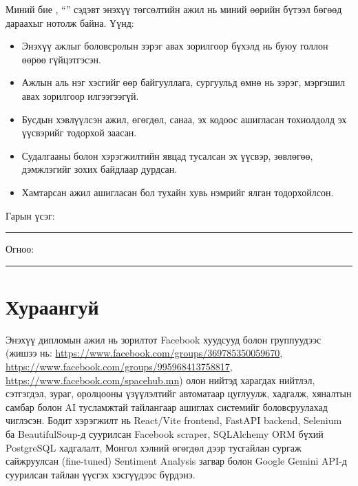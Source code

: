 \documentclass[
12pt,
oneside,
english,
onehalfspacing,
nolistspacing,
headsepline,
]{MUST-Thesis}
\newcommand{\authorshipname}{Зохиогч эрхийн хамгаалал}
\begin{document}
\begin{declaration}
\addchaptertocentry{\authorshipname}

\noindent Миний бие \shortname, ``\ttitle'' сэдэвт энэхүү төгсөлтийн ажил нь миний өөрийн бүтээл бөгөөд дараахыг нотолж байна. Үүнд:

\begin{itemize}
    \item Энэхүү ажлыг боловсролын зэрэг авах зорилгоор бүхэлд нь буюу голлон өөрөө гүйцэтгэсэн.
    \item Ажлын аль нэг хэсгийг өөр байгууллага, сургуульд өмнө нь зэрэг, мэргэшил авах зорилгоор илгээгээгүй.
    \item Бусдын хэвлүүлсэн ажил, өгөгдөл, санаа, эх кодоос ашигласан тохиолдолд эх үүсвэрийг тодорхой заасан.
    \item Судалгааны болон хэрэгжилтийн явцад тусалсан эх үүсвэр, зөвлөгөө, дэмжлэгийг зохих байдлаар дурдсан.
    \item Хамтарсан ажил ашигласан бол тухайн хувь нэмрийг ялган тодорхойлсон.
\end{itemize}
\bigskip

\noindent Гарын үсэг: \rule[-0.5em]{12.7em}{0.5pt}
\bigskip

\noindent Огноо: \rule[-0.5em]{15em}{0.5pt}
\end{declaration}

\clearpage

\chapter*{Хураангуй}

Энэхүү дипломын ажил нь зорилтот Facebook хуудсууд болон группуудээс (жишээ нь: \url{https://www.facebook.com/groups/369785350059670}, \url{https://www.facebook.com/groups/995968413758817}, \url{https://www.facebook.com/spacehub.mn}) олон нийтэд харагдах нийтлэл, сэтгэгдэл, зураг, оролцооны үзүүлэлтийг автоматаар цуглуулж, хадгалж, хяналтын самбар болон AI тусламжтай тайлангаар ашиглах системийг боловсруулахад чиглэсэн. Бодит хэрэгжилт нь React/Vite frontend, FastAPI backend, Selenium ба BeautifulSoup-д суурилсан Facebook scraper, SQLAlchemy ORM бүхий PostgreSQL хадгалалт, Монгол хэлний өгөгдөл дээр тусгайлан сургаж сайжруулсан (fine-tuned) Sentiment Analysis загвар болон Google Gemini API-д суурилсан тайлан үүсгэх хэсгүүдээс бүрдэнэ.
\end{document}

